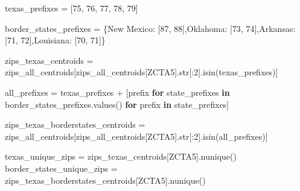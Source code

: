 \documentclass[
  letterpaper,
  DIV=11,
  numbers=noendperiod]{scrartcl}
\newenvironment{Shaded}{\begin{snugshade}}{\end{snugshade}}
\newcommand{\BuiltInTok}[1]{\textcolor[rgb]{0.00,0.23,0.31}{#1}}
\newcommand{\ControlFlowTok}[1]{\textcolor[rgb]{0.00,0.23,0.31}{\textbf{#1}}}
\newcommand{\DecValTok}[1]{\textcolor[rgb]{0.68,0.00,0.00}{#1}}
\newcommand{\KeywordTok}[1]{\textcolor[rgb]{0.00,0.23,0.31}{\textbf{#1}}}
\newcommand{\NormalTok}[1]{\textcolor[rgb]{0.00,0.23,0.31}{#1}}
\newcommand{\OperatorTok}[1]{\textcolor[rgb]{0.37,0.37,0.37}{#1}}
\newcommand{\StringTok}[1]{\textcolor[rgb]{0.13,0.47,0.30}{#1}}
\begin{document}
\begin{Shaded}
\begin{Highlighting}[]
\NormalTok{texas\_prefixes }\OperatorTok{=}\NormalTok{ [}\StringTok{\textquotesingle{}75\textquotesingle{}}\NormalTok{, }\StringTok{\textquotesingle{}76\textquotesingle{}}\NormalTok{, }\StringTok{\textquotesingle{}77\textquotesingle{}}\NormalTok{, }\StringTok{\textquotesingle{}78\textquotesingle{}}\NormalTok{, }\StringTok{\textquotesingle{}79\textquotesingle{}}\NormalTok{]}

\NormalTok{border\_states\_prefixes }\OperatorTok{=}\NormalTok{ \{}\StringTok{\textquotesingle{}New Mexico\textquotesingle{}}\NormalTok{: [}\StringTok{\textquotesingle{}87\textquotesingle{}}\NormalTok{, }\StringTok{\textquotesingle{}88\textquotesingle{}}\NormalTok{],}\StringTok{\textquotesingle{}Oklahoma\textquotesingle{}}\NormalTok{: [}\StringTok{\textquotesingle{}73\textquotesingle{}}\NormalTok{, }\StringTok{\textquotesingle{}74\textquotesingle{}}\NormalTok{],}\StringTok{\textquotesingle{}Arkansas\textquotesingle{}}\NormalTok{: [}\StringTok{\textquotesingle{}71\textquotesingle{}}\NormalTok{, }\StringTok{\textquotesingle{}72\textquotesingle{}}\NormalTok{],}\StringTok{\textquotesingle{}Louisiana\textquotesingle{}}\NormalTok{: [}\StringTok{\textquotesingle{}70\textquotesingle{}}\NormalTok{, }\StringTok{\textquotesingle{}71\textquotesingle{}}\NormalTok{]\}}

\NormalTok{zips\_texas\_centroids }\OperatorTok{=}\NormalTok{ zips\_all\_centroids[zips\_all\_centroids[}\StringTok{\textquotesingle{}ZCTA5\textquotesingle{}}\NormalTok{].}\BuiltInTok{str}\NormalTok{[:}\DecValTok{2}\NormalTok{].isin(texas\_prefixes)]}

\NormalTok{all\_prefixes }\OperatorTok{=}\NormalTok{ texas\_prefixes }\OperatorTok{+}\NormalTok{ [prefix }\ControlFlowTok{for}\NormalTok{ state\_prefixes }\KeywordTok{in}\NormalTok{ border\_states\_prefixes.values() }\ControlFlowTok{for}\NormalTok{ prefix }\KeywordTok{in}\NormalTok{ state\_prefixes]}

\NormalTok{zips\_texas\_borderstates\_centroids }\OperatorTok{=}\NormalTok{ zips\_all\_centroids[zips\_all\_centroids[}\StringTok{\textquotesingle{}ZCTA5\textquotesingle{}}\NormalTok{].}\BuiltInTok{str}\NormalTok{[:}\DecValTok{2}\NormalTok{].isin(all\_prefixes)]}

\NormalTok{texas\_unique\_zips }\OperatorTok{=}\NormalTok{ zips\_texas\_centroids[}\StringTok{\textquotesingle{}ZCTA5\textquotesingle{}}\NormalTok{].nunique()}
\NormalTok{border\_states\_unique\_zips }\OperatorTok{=}\NormalTok{ zips\_texas\_borderstates\_centroids[}\StringTok{\textquotesingle{}ZCTA5\textquotesingle{}}\NormalTok{].nunique()}



\end{Highlighting}
\end{Shaded}
\end{document}
